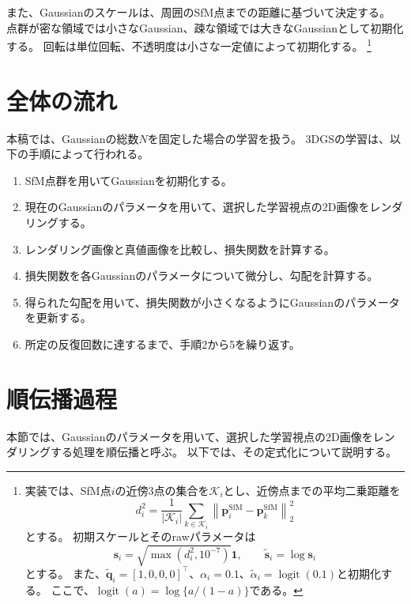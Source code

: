\documentclass[dvipdfmx]{jlreq}
\begin{document}
また、Gaussianのスケールは、周囲のSfM点までの距離に基づいて決定する。
点群が密な領域では小さなGaussian、疎な領域では大きなGaussianとして初期化する。
回転は単位回転、不透明度は小さな一定値によって初期化する。
\footnote{
実装では、SfM点$i$の近傍3点の集合を$\mathcal{K}_i$とし、近傍点までの平均二乗距離を
\begin{equation*}
    d_i^2 = \frac{1}{|\mathcal{K}_i|} \sum_{k\in\mathcal{K}_i}\left\|\bm{p}_i^{\mathrm{SfM}} -\bm{p}_k^{\mathrm{SfM}}\right\|_2^2
\end{equation*}
とする。
初期スケールとそのrawパラメータは
\begin{equation*}
    \bm{s}_i = \sqrt{\max\left(d_i^2,10^{-7}\right)}\bm{1}, \qquad \widetilde{\bm{s}}_i =\log\bm{s}_i
\end{equation*}
とする。
また、$\widetilde{\bm{q}}_i=[1,0,0,0]^{\top}$、$\alpha_i=0.1$、$\widetilde{\alpha}_i=\operatorname{logit}(0.1)$と初期化する。
ここで、$\operatorname{logit}(a)=\log\{a/(1-a)\}$である。
}

\section{全体の流れ}
本稿では、Gaussianの総数$N$を固定した場合の学習を扱う。
3DGSの学習は、以下の手順によって行われる。

\begin{enumerate}
    \item SfM点群を用いてGaussianを初期化する。
    \item 現在のGaussianのパラメータを用いて、選択した学習視点の2D画像をレンダリングする。
    \item レンダリング画像と真値画像を比較し、損失関数を計算する。
    \item 損失関数を各Gaussianのパラメータについて微分し、勾配を計算する。
    \item 得られた勾配を用いて、損失関数が小さくなるようにGaussianのパラメータを更新する。
    \item 所定の反復回数に達するまで、手順2から5を繰り返す。
\end{enumerate}

\section{順伝播過程}
本節では、Gaussianのパラメータを用いて、選択した学習視点の2D画像をレンダリングする処理を順伝播と呼ぶ。
以下では、その定式化について説明する。
\end{document}
